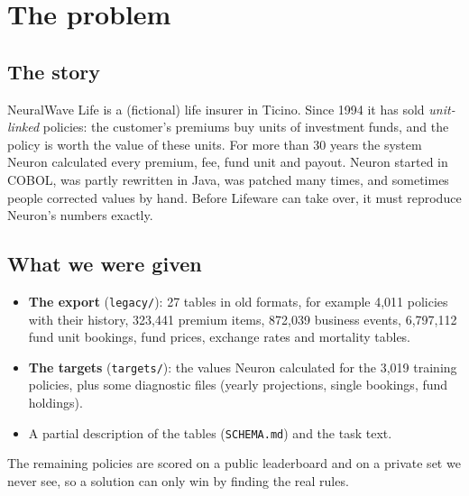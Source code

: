 \documentclass[11pt,a4paper]{article}
\newcommand{\code}[1]{\texttt{#1}}
\begin{document}
\section{The problem}

\subsection{The story}
NeuralWave Life is a (fictional) life insurer in Ticino. Since 1994 it has sold \emph{unit-linked} policies: the
customer's premiums buy units of investment funds, and the policy is worth the value of these units. For more than
30 years the system Neuron calculated every premium, fee, fund unit and payout. Neuron started in COBOL, was partly
rewritten in Java, was patched many times, and sometimes people corrected values by hand. Before Lifeware can take
over, it must reproduce Neuron's numbers exactly.

\subsection{What we were given}
\begin{itemize}
  \item \textbf{The export} (\code{legacy/}): 27 tables in old formats, for example 4,011 policies with their history,
        323,441 premium items, 872,039 business events, 6,797,112 fund unit bookings, fund prices, exchange rates and
        mortality tables.
  \item \textbf{The targets} (\code{targets/}): the values Neuron calculated for the 3,019 training policies, plus
        some diagnostic files (yearly projections, single bookings, fund holdings).
  \item A partial description of the tables (\code{SCHEMA.md}) and the task text.
\end{itemize}
The remaining policies are scored on a public leaderboard and on a private set we never see, so a solution can only
win by finding the real rules.
\end{document}
